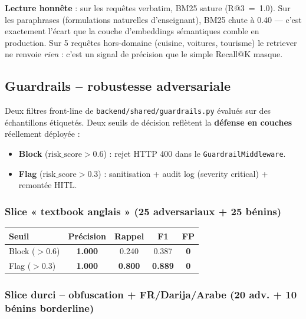 \documentclass[11pt,a4paper]{article}
\begin{document}
\textbf{Lecture honnête} : sur les requêtes verbatim, BM25 sature (R@3~=~1.0).
Sur les paraphrases (formulations naturelles d'enseignant), BM25 chute à 0.40
--- c'est exactement l'écart que la couche d'embeddings sémantiques comble en
production. Sur 5 requêtes hors-domaine (cuisine, voitures, tourisme) le
retriever ne renvoie \emph{rien} : c'est un signal de précision que le simple
Recall@K masque.

\subsection{Guardrails -- robustesse adversariale}

Deux filtres front-line de \texttt{backend/shared/guardrails.py} évalués sur
des échantillons étiquetés. Deux seuils de décision reflètent la
\textbf{défense en couches} réellement déployée :

\begin{itemize}[leftmargin=1.2em,itemsep=2pt,topsep=2pt]
  \item \textbf{\textcolor{danger}{Block}} ($\text{risk\_score} > 0.6$) :
    rejet HTTP 400 dans le \texttt{GuardrailMiddleware}.
  \item \textbf{\textcolor{warn}{Flag}} ($\text{risk\_score} > 0.3$) :
    sanitisation + audit log (severity critical) + remontée HITL.
\end{itemize}

\subsubsection*{Slice « textbook anglais » (25 adversariaux + 25 bénins)}

\begin{center}
\small
\begin{tabular}{@{}lcccc@{}}
\toprule
\textbf{Seuil}  & \textbf{Précision} & \textbf{Rappel} & \textbf{F1} & \textbf{FP} \\
\midrule
Block ($>$0.6)  & \textbf{1.000} & 0.240          & 0.387          & \textbf{0} \\
Flag  ($>$0.3)  & \textbf{1.000} & \textbf{0.800} & \textbf{0.889} & \textbf{0} \\
\bottomrule
\end{tabular}
\end{center}

\subsubsection*{Slice durci -- obfuscation + FR/Darija/Arabe (20 adv. + 10 bénins borderline)}
\end{document}
